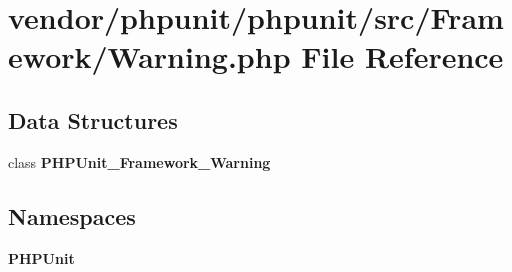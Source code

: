 \section{vendor/phpunit/phpunit/src/\+Framework/\+Warning.php File Reference}
\label{_warning_8php}
\subsection*{Data Structures}
\begin{DoxyCompactItemize}
\item 
class {\bf P\+H\+P\+Unit\+\_\+\+Framework\+\_\+\+Warning}
\end{DoxyCompactItemize}
\subsection*{Namespaces}
\begin{DoxyCompactItemize}
\item 
 {\bf P\+H\+P\+Unit}
\end{DoxyCompactItemize}
